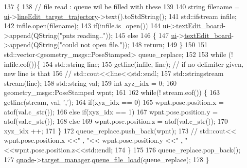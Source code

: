 \begin{DoxyCode}
137 \{
138     \textcolor{comment}{// file read : queue wil be filled with these}
139 
140     \textcolor{keywordtype}{string} filename = \hyperlink{class_main_window_a35466a70ed47252a0191168126a352a5}{ui}->\hyperlink{class_ui___main_window_a4a75bfb754049f89fccef822cad712d6}{lineEdit\_target\_trajectory}->text().toStdString();
141     std::ifstream infile;
142     infile.open(filename);
143     \textcolor{keywordflow}{if}(infile.is\_open())
144         \hyperlink{class_main_window_a35466a70ed47252a0191168126a352a5}{ui}->\hyperlink{class_ui___main_window_af13441b9fd874f1aeb2ec5cefaeb0bce}{textEdit\_board}->append(QString(\textcolor{stringliteral}{"pnts reading.."}));
145     \textcolor{keywordflow}{else}
146     \{
147         \hyperlink{class_main_window_a35466a70ed47252a0191168126a352a5}{ui}->\hyperlink{class_ui___main_window_af13441b9fd874f1aeb2ec5cefaeb0bce}{textEdit\_board}->append(QString(\textcolor{stringliteral}{"could not open file."}));
148         \textcolor{keywordflow}{return};
149     \}
150 
151     std::vector<geometry\_msgs::PoseStamped> queue\_replace;
152 
153     \textcolor{keywordflow}{while} (! infile.eof())\{
154         std::string line;
155         getline(infile, line); \textcolor{comment}{// if no delimiter given, new line is that}
156         \textcolor{comment}{// std::cout<<line<<std::endl;}
157         std::stringstream stream(line);
158         std::string val;
159         \textcolor{keywordtype}{int} xyz\_idx = 0;
160         geometry\_msgs::PoseStamped wpnt;
161 
162         \textcolor{keywordflow}{while}(! stream.eof()) \{
163             getline(stream, val, \textcolor{charliteral}{','});
164             \textcolor{keywordflow}{if}(xyz\_idx == 0)
165                 wpnt.pose.position.x = atof(val.c\_str());
166             \textcolor{keywordflow}{else} \textcolor{keywordflow}{if}(xyz\_idx == 1)
167                 wpnt.pose.position.y = atof(val.c\_str());
168             \textcolor{keywordflow}{else}
169                 wpnt.pose.position.z = atof(val.c\_str());
170             xyz\_idx ++;
171         \}
172         queue\_replace.push\_back(wpnt);
173         \textcolor{comment}{// std::cout<< wpnt.pose.position.x <<" , "<< wpnt.pose.position.y <<" ,
       "<<wpnt.pose.position.z<<std::endl;}
174     \}
175 
176     queue\_replace.pop\_back();
177     \hyperlink{class_main_window_ac9d45be6e40fe6917339119e15c1b120}{qnode}->\hyperlink{class_q_node_adc66765125dfd755d5e7f0c0eb6e6395}{target\_manager}.\hyperlink{class_target_manager_a8b96689879cecac3d9109914eb6230ef}{queue\_file\_load}(queue\_replace);
178 \}
\end{DoxyCode}
